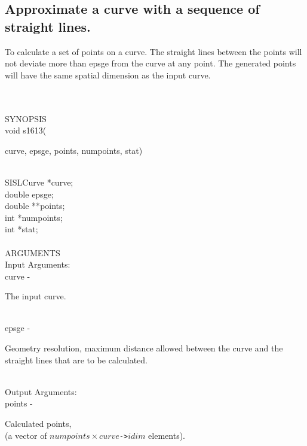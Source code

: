 \subsection{Approximate a curve with a sequence of straight lines.}
\begin{minipg1}
  To calculate a set of points on a curve. The straight lines between the
  points will not deviate more than {\fov epsge} from the curve at any
  point.  The generated points will have the same spatial dimension as
  the input curve.
\end{minipg1} \\ \\
SYNOPSIS\\
        \>void s1613(\begin{minipg3}
        {\fov curve}, {\fov epsge}, {\fov points}, {\fov numpoints}, {\fov stat})
                \end{minipg3}\\[0.3ex]
                \>\>    SISLCurve       \>      *{\fov curve};\\
                \>\>    double  \>      {\fov epsge};\\
                \>\>    double  \>      **{\fov points};\\
                \>\>    int     \>      *{\fov numpoints};\\
                \>\>    int     \>      *{\fov stat};\\
\\
ARGUMENTS\\
        \>Input Arguments:\\
        \>\>    {\fov curve}    \> - \> \begin{minipg2}
                                The input curve.
                                \end{minipg2}\\
        \>\>    {\fov epsge}\> - \>     \begin{minipg2}
                                Geometry resolution, maximum distance allowed
                                between the curve and the straight lines that are to be
                                calculated.
                                \end{minipg2}\\[0.8ex]
        \>Output Arguments:\\
        \>\>    {\fov points}   \> - \> \begin{minipg2}
                                Calculated points,\\
                                (a vector of
                                $numpoints\times curve${\tt ->}$idim$ elements).
                                \end{minipg2}\\[0.3ex]
